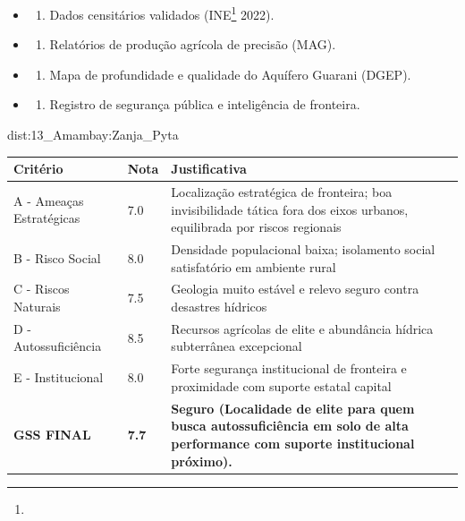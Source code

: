 {\begin{itemize}
\tightlist
\item
  \begin{enumerate}
  \def\labelenumi{\arabic{enumi})}
  \tightlist
  \item
    Dados censitários validados (INE\footnote{\fineINE} 2022).
  \end{enumerate}
\item
  \begin{enumerate}
  \def\labelenumi{\arabic{enumi})}
  \setcounter{enumi}{1}
  \tightlist
  \item
    Relatórios de produção agrícola de precisão (MAG).
  \end{enumerate}
\item
  \begin{enumerate}
  \def\labelenumi{\arabic{enumi})}
  \setcounter{enumi}{2}
  \tightlist
  \item
    Mapa de profundidade e qualidade do Aquífero Guarani (DGEP).
  \end{enumerate}
\item
  \begin{enumerate}
  \def\labelenumi{\arabic{enumi})}
  \setcounter{enumi}{3}
  \tightlist
  \item
    Registro de segurança pública e inteligência de fronteira.
  \end{enumerate}
\end{itemize}}{dist:13_Amambay:Zanja_Pyta}
\begin{table}[ht!]
\small \begin{tabular}{p{3.0cm}p{0.8cm}p{6.0cm}} \toprule
\textbf{Critério} & \textbf{Nota} & \textbf{Justificativa} \\ \midrule
A - Ameaças Estratégicas & 7.0 & Localização estratégica de fronteira; boa invisibilidade tática fora dos eixos urbanos, equilibrada por riscos regionais \\
B - Risco Social & 8.0 & Densidade populacional baixa; isolamento social satisfatório em ambiente rural \\
C - Riscos Naturais & 7.5 & Geologia muito estável e relevo seguro contra desastres hídricos \\
D - Autossuficiência & 8.5 & Recursos agrícolas de elite e abundância hídrica subterrânea excepcional \\
E - Institucional & 8.0 & Forte segurança institucional de fronteira e proximidade com suporte estatal capital \\
\midrule \textbf{GSS FINAL} & \textbf{7.7} & \textbf{Seguro (Localidade de elite para quem busca autossuficiência em solo de alta performance com suporte institucional próximo).} \\ \bottomrule \end{tabular}
\end{table}

